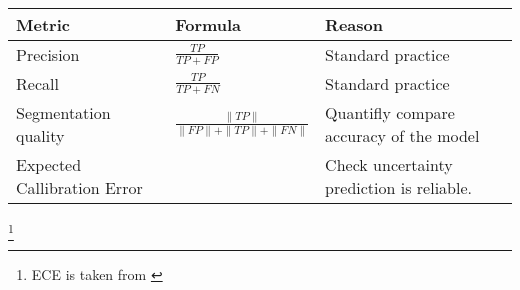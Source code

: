 \begin{table}[]
    \begin{tabular}{l|l|l}
        Metric                      & Formula                                   & Reason                                     \\
        \hline
        Precision                   & $\frac{TP}{TP + FP}$                      & Standard practice                          \\
        Recall                      & $\frac{TP}{TP + FN}$                      & Standard practice                          \\
        Segmentation quality        & $\frac{\|TP\|}{\|FP\| + \|TP\| + \|FN\|}$ & Quantifly compare accuracy of the model    \\
        Expected Callibration Error &                                           & Check uncertainty prediction is reliable.
    \end{tabular}
\end{table}

\footnote[1]{ECE is taken from \cite{guo2017calibration}}

